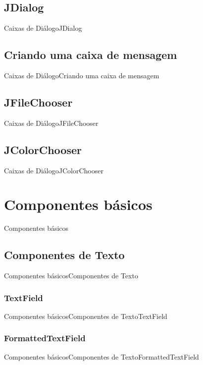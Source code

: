 \documentclass[10pt]{beamer}
\begin{document}
\subsection{JDialog}
\begin{frame}{Caixas de Diálogo}{JDialog}
\end{frame}{}
\subsection{Criando uma caixa de mensagem}
\begin{frame}{Caixas de Diálogo}{Criando uma caixa de mensagem}
\end{frame}{}
\subsection{JFileChooser}
\begin{frame}{Caixas de Diálogo}{JFileChooser}
\end{frame}{}
\subsection{JColorChooser}
\begin{frame}{Caixas de Diálogo}{JColorChooser}
\end{frame}{}
\section{Componentes básicos}
\begin{frame}{Componentes básicos}{}
\end{frame}{}
\subsection{Componentes de Texto}
\begin{frame}{Componentes básicos}{Componentes de Texto}
\end{frame}{}
\subsubsection{TextField}
\begin{frame}{Componentes básicos}{Componentes de Texto}{TextField}
\end{frame}{}
\subsubsection{FormattedTextField}
\begin{frame}{Componentes básicos}{Componentes de Texto}{FormattedTextField}
\end{frame}{}
\end{document}
